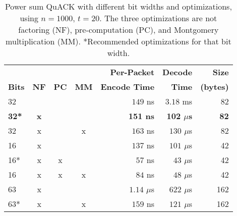 \begin{table}[ht]
  \centering
  \begin{tabular}{lcccrrr}
    \toprule
    \bf     & \bf        & \bf       & \bf        & \bf Per-Packet & \bf Decode & \bf Size\\
    \bf Bits  & \bf NF     & \bf PC    & \bf MM     & \bf Encode Time & \bf Time     & \bf (bytes)\\
    \midrule
    32     &        &       &        & $149$ ns & $3.18$ ms      & 82 \\
    \bf \textcolor{black!50!blue}{32*} & \bf \textcolor{black!50!blue}{x} & & & \bf \textcolor{black!50!blue}{151 ns} & \bf \textcolor{black!50!blue}{102 ${\mu}$s} & \bf \textcolor{black!50!blue}{82} \\
    32     & x      &       & x      & $163$ ns & $130$ ${\mu}$s & 82 \\
    16     & x      &       &        & $137$ ns & $101$ ${\mu}$s & 42 \\
    16*    & x      & x     &        & $57$ ns & $43$ ${\mu}$s & 42 \\
    16     & x      & x     & x      & $84$ ns & $48$ ${\mu}$s & 42 \\
    63     & x      &       &        & $1.14$ ${\mu}$s & $622$ ${\mu}$s & 162 \\
    63*    & x      &       & x      & $159$ ns & $121$ ${\mu}$s & 162 \\
    \bottomrule
  \end{tabular}
  \caption{Power sum QuACK with different bit widths and optimizations,
  using $n=1000$, $t=20$. The three optimizations are not factoring (NF),
  pre-computation (PC), and Montgomery multiplication (MM).
  *Recommended optimizations for that bit width.}
  \label{tab:quack:optimized-quack}
\end{table}
